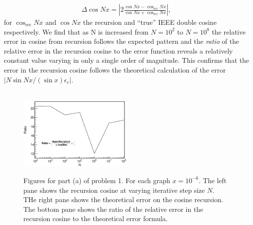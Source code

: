 \documentclass[singlepage,notitlepage,nofootinbib,12pt]{revtex4-1}
\begin{document}
\begin{align*}
\Delta\cos N x = \left|2\frac{\cos N x - \cos_{\text{rec}}Nx}{\cos N x + \cos_{\text{rec}}Nx}\right|,
\end{align*}
for $\cos_{\text{rec}} Nx$ and $\cos Nx$ the recursion and ``true'' IEEE double cosine respectively. We find that as N is increased from $N=10^{2}$ to $N=10^8$ the relative error in cosine from recursion follows the expected pattern and the {\it ratio} of the relative error in the recursion cosine to the error function reveals a relatively constant value varying in only a single order of magnitude. This confirms that the error in the recursion cosine follows the theoretical calculation of the error $|N\sin N x/(\sin x)\epsilon_c|$.
\begin{figure}[h]
  \centering
{}
\\
  \includegraphics[width=0.5\textwidth]{figures/1a_ratio.eps}
  \hfill
  \caption{Figures for part (a) of problem 1. For each graph $x = 10^{-6}$. The left pane shows the recursion cosine at varying iterative step size $N$. THe right pane shows the theoretical error on the cosine recursion. The bottom pane shows the ratio of the relative error in the recursion cosine to the theoretical error formula.}
\end{figure}\\
\end{document}
